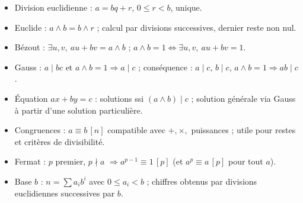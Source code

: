 \documentclass[11pt,a4paper]{article}
\begin{document}
\vspace{4mm}
\begin{tcolorbox}[
  enhanced, boxrule=0pt, arc=2mm,
  interior style={left color=qtealdark, right color=qteal},
  left=6mm, right=6mm, top=4mm, bottom=4mm,
  fontupper=\color{white}\sffamily,
  title={\sffamily\bfseries\color{white}\ding{72}~~À retenir},
  colbacktitle=qtealdark, coltitle=white, boxrule=0pt
]
\begin{itemize}[leftmargin=6mm, label={\color{qamber}}, itemsep=1mm]
  \item Division euclidienne : $a=bq+r$, $0\leq r<b$, unique.
  \item Euclide : $a\wedge b=b\wedge r$ ; calcul par divisions successives, dernier reste non nul.
  \item Bézout : $\exists u,v,\ au+bv=a\wedge b$ ; $a\wedge b=1\iff\exists u,v,\ au+bv=1$.
  \item Gauss : $a\mid bc$ et $a\wedge b=1\Rightarrow a\mid c$ ; conséquence : $a\mid c$, $b\mid c$, $a\wedge b=1\Rightarrow ab\mid c$.
  \item Équation $ax+by=c$ : solutions ssi $(a\wedge b)\mid c$ ; solution générale via Gauss à partir d'une solution particulière.
  \item Congruences : $a\equiv b\,[n]$ compatible avec $+,\times,$ puissances ; utile pour restes et critères de divisibilité.
  \item Fermat : $p$ premier, $p\nmid a$ $\Rightarrow a^{p-1}\equiv1\,[p]$ (et $a^p\equiv a\,[p]$ pour tout $a$).
  \item Base $b$ : $n=\sum a_ib^i$ avec $0\leq a_i<b$ ; chiffres obtenus par divisions euclidiennes successives par $b$.
\end{itemize}
\end{tcolorbox}
\end{document}
